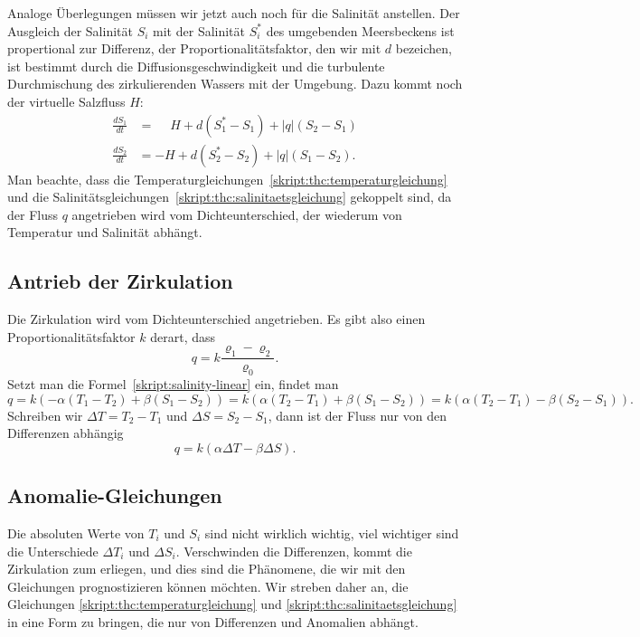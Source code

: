 Analoge Überlegungen müssen wir jetzt auch noch für die Salinität anstellen.
Der Ausgleich der Salinität $S_i$ mit der Salinität $S_i^*$ des
umgebenden Meersbeckens ist propertional zur Differenz, der
Proportionalitätsfaktor, den wir mit $d$ bezeichen, ist bestimmt durch
die Diffusionsgeschwindigkeit und die turbulente Durchmischung des
zirkulierenden Wassers mit der Umgebung.
Dazu kommt noch der virtuelle Salzfluss $H$:
\begin{equation}
\begin{aligned}
\frac{dS_1}{dt}
&=
\phantom{-}
H
+
d(S_1^*-S_1)
+
|q|(S_2-S_1)
\\
\frac{dS_2}{dt}
&=
-H
+
d(S_2^*-S_2)
+
|q|(S_1-S_2).
\end{aligned}
\label{skript:thc:salinitaetsgleichung}
\end{equation}
Man beachte, dass die Temperaturgleichungen~\ref{skript:thc:temperaturgleichung}
und die Salinitätsgleichungen~\ref{skript:thc:salinitaetsgleichung} 
gekoppelt sind, da der Fluss $q$ angetrieben wird vom Dichteunterschied,
der wiederum von Temperatur und Salinität abhängt.

\subsection{Antrieb der Zirkulation}
Die Zirkulation wird vom Dichteunterschied angetrieben.
Es gibt also einen Proportionalitätsfaktor $k$ derart, dass
\[
q = k\frac{\varrho_1 - \varrho_2}{\varrho_0}.
\]
Setzt man die Formel~\ref{skript:salinity-linear} ein, findet man
\[
q
=
k(-\alpha(T_1-T_2) + \beta(S_1-S_2))
=
k(\alpha(T_2-T_1) + \beta(S_1-S_2))
=
k(\alpha(T_2-T_1) - \beta(S_2-S_1)).
\]
Schreiben wir $\Delta T = T_2-T_1$ und $\Delta S=S_2-S_1$,
dann ist der Fluss nur von den Differenzen abhängig
\begin{equation}
q=k(\alpha\Delta T-\beta\Delta S).
\label{skript:thc:fluss-delta}
\end{equation}

\subsection{Anomalie-Gleichungen}
Die absoluten Werte von $T_i$ und $S_i$ sind nicht wirklich wichtig,
viel wichtiger sind die Unterschiede $\Delta T_i$ und $\Delta S_i$.
Verschwinden die Differenzen, kommt die Zirkulation zum erliegen,
und dies sind die Phänomene, die wir mit den Gleichungen prognostizieren
können möchten.
Wir streben daher an, die Gleichungen
\eqref{skript:thc:temperaturgleichung}
und
\eqref{skript:thc:salinitaetsgleichung}
in eine Form zu bringen, die nur von Differenzen und Anomalien
abhängt.

